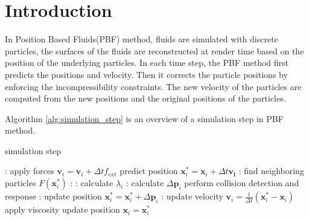 \documentclass[sigconf]{acmart}
\newcommand{\vect}[1]{\boldsymbol{#1}}
\begin{document}


\maketitle

\section{Introduction}
In Position Based Fluids(PBF) method, fluids are simulated with discrete particles, the surfaces of the fluids are reconstructed at render time based on the position of the underlying particles. In each time step, the PBF method first predicts the positions and velocity. Then it corrects the particle positions by enforcing the incompressibility constraints. The new velocity of the particles are computed from the new positions and the original positions of the particles.

Algorithm \ref{alg:simulation_step} is an overview of a simulation step in PBF method.

\begin{algorithm}
  \caption{simulation step}
  \label{alg:simulation_step}
  \begin{algorithmic}[1]
    : 
    \State apply forces $\vect{v}_i = \vect{v}_i + \Delta t f_{ext}$
    \State predict position $\vect{x}_i^* = \vect{x}_i + \Delta t \vect{v_i}$
    \EndFor
    :
    \State find neighboring particles $F(\vect{x}_i^*)$
    \EndFor
    : 
      :
      \State calculate $\lambda_i$
      \EndFor
      :
      \State calculate $\Delta \vect{p}_i$
      \State perform collision detection and response
      \EndFor
      :
      \State update position $\vect{x}_i^* = \vect{x}_i^* + \Delta \vect{p}_i$
      \EndFor
    \EndWhile
    :
    \State update velocity $\vect{v}_i = \frac{1}{\Delta t}(\vect{x}_i^*-\vect{x}_i)$
    \State apply viscosity
    \State update position $\vect{x}_i = \vect{x}_i^*$
      \EndFor
  \end{algorithmic}
\end{algorithm}
\end{document}
